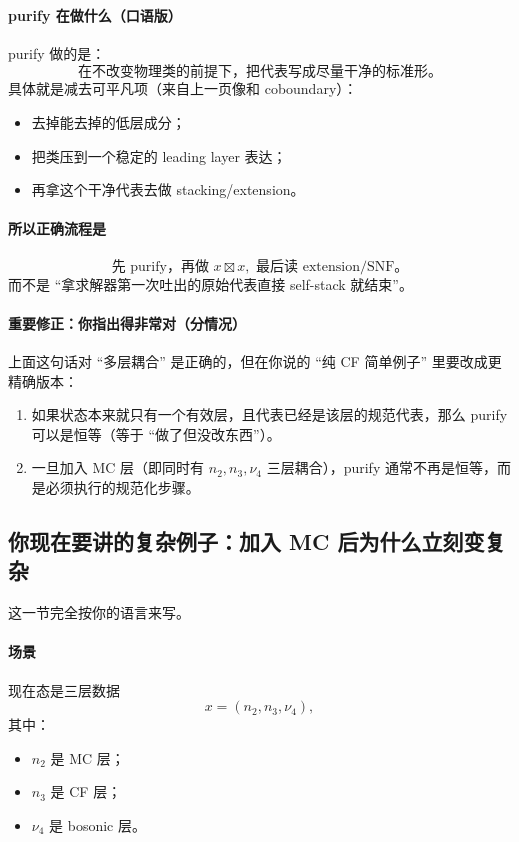 \documentclass[a4paper,fontset=ubuntu,12pt]{ctexart}
\begin{document}
\paragraph{purify 在做什么（口语版）}
purify 做的是：
\begin{equation}
\text{在不改变物理类的前提下，把代表写成尽量干净的标准形。}
\label{eq:purify-human}
\end{equation}
具体就是减去可平凡项（来自上一页像和 coboundary）：
\begin{itemize}
\item 去掉能去掉的低层成分；
\item 把类压到一个稳定的 leading layer 表达；
\item 再拿这个干净代表去做 stacking/extension。
\end{itemize}

\paragraph{所以正确流程是}
\begin{equation}
\text{先 purify，再做 }x\boxtimes x,\text{ 最后读 extension/SNF。}
\label{eq:correct-order}
\end{equation}
而不是 ``拿求解器第一次吐出的原始代表直接 self-stack 就结束''。

\paragraph{重要修正：你指出得非常对（分情况）}
上面这句话对 ``多层耦合'' 是正确的，但在你说的 ``纯 CF 简单例子'' 里要改成更精确版本：
\begin{enumerate}
\item 如果状态本来就只有一个有效层，且代表已经是该层的规范代表，那么 purify 可以是恒等（等于 ``做了但没改东西''）。
\item 一旦加入 MC 层（即同时有 $n_2,n_3,\nu_4$ 三层耦合），purify 通常不再是恒等，而是必须执行的规范化步骤。
\end{enumerate}

\subsection{你现在要讲的复杂例子：加入 MC 后为什么立刻变复杂}
\label{sec:mc-cf-bos-complexity}

这一节完全按你的语言来写。

\paragraph{场景}
现在态是三层数据
\begin{equation}
x=(n_2,n_3,\nu_4),
\label{eq:three-layer-x}
\end{equation}
其中：
\begin{itemize}
\item $n_2$ 是 MC 层；
\item $n_3$ 是 CF 层；
\item $\nu_4$ 是 bosonic 层。
\end{itemize}
\end{document}
